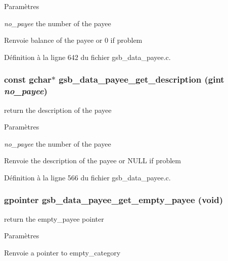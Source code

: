\begin{DoxyParams}{Paramètres}
\item[{\em no\_\-payee}]the number of the payee\end{DoxyParams}
\begin{DoxyReturn}{Renvoie}
balance of the payee or 0 if problem 
\end{DoxyReturn}


Définition à la ligne 642 du fichier gsb\_\-data\_\-payee.c.

\subsubsection[{gsb\_\-data\_\-payee\_\-get\_\-description}]{\setlength{\rightskip}{0pt plus 5cm}const gchar$\ast$ gsb\_\-data\_\-payee\_\-get\_\-description (gint {\em no\_\-payee})}\label{gsb__data__payee_8c_a0b399cb8a65b9225323207be946c0d10}
return the description of the payee


\begin{DoxyParams}{Paramètres}
\item[{\em no\_\-payee}]the number of the payee\end{DoxyParams}
\begin{DoxyReturn}{Renvoie}
the description of the payee or NULL if problem 
\end{DoxyReturn}


Définition à la ligne 566 du fichier gsb\_\-data\_\-payee.c.

\subsubsection[{gsb\_\-data\_\-payee\_\-get\_\-empty\_\-payee}]{\setlength{\rightskip}{0pt plus 5cm}gpointer gsb\_\-data\_\-payee\_\-get\_\-empty\_\-payee (void)}\label{gsb__data__payee_8c_a9127e3118fee2249a31d1139e4cff6f1}
return the empty\_\-payee pointer


\begin{DoxyParams}{Paramètres}
\item[{\em }]\end{DoxyParams}
\begin{DoxyReturn}{Renvoie}
a pointer to empty\_\-category 
\end{DoxyReturn}


